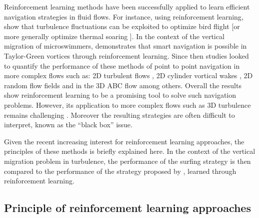 Reinforcement learning methods have been successfully applied to learn efficient navigation strategies in fluid flows.
For instance, using reinforcement learning, \citet{reddy2016learning} show that turbulence fluctuations can be exploited to optimize bird flight [or more generally optimize thermal soaring \citep{reddy2018glider, reddy2018soaring}].
In the context of the vertical migration of microswimmers, \citet{colabrese2017flow} demonstrates that smart navigation is possible in Taylor-Green vortices through reinforcement learning.
Since then studies looked to quantify the performance of these methods of point to point navigation in more complex flows such as: 2D turbulent flows \citep{biferale2019zermelo, alageshan2020machine, qiu2022navigation}, 2D cylinder vortical wakes \citep{gunnarson2021learning}, 2D random flow fields \citep{qiu2022navigation} and in the 3D ABC flow \citep{gustavsson2017finding} among others.
Overall the results show reinforcement learning to be a promising tool to solve such navigation problems.
However, its application to more complex flows such as 3D turbulence remains challenging \citep{alageshan2020machine, qiu2022active}.
Moreover the resulting strategies are often difficult to interpret, known as the ``black box'' issue.


Given the recent increasing interest for reinforcement learning approaches, the principles of these methods is briefly explained here. 
In the context of the vertical migration problem in turbulence, the performance of the surfing strategy is then compared to the performance of the strategy proposed by \citet{alageshan2020machine}, learned through reinforcement learning.

\subsection{Principle of reinforcement learning approaches}

